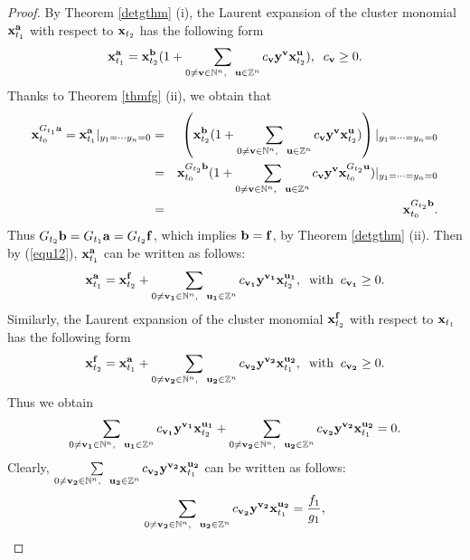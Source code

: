 \documentclass[14pt]{amsart}
\begin{document}
\begin{proof}
By Theorem \ref{detgthm} (i),  the Laurent expansion of the cluster monomial  ${\bf x}_{t_1}^{\bf a}$ with respect to ${\bf x}_{t_2}$  has the following form
\begin{equation}\label{equ12}
{\bf x}_{t_1}^{\bf a}={\bf x}_{t_2}^{{\bf b}}(1+\sum\limits_{0\neq {\bf v}\in\mathbb N^n,~~{\bf u}\in\mathbb Z^n}c_{\bf v}{\bf y}^{\bf v}{\bf x}_{t_2}^{\bf u}),\;\;c_{\bf v}\geq 0.
\end{equation}
Thanks to Theorem \ref{thmfg} (ii), we obtain that
\begin{eqnarray}
{\bf x}_{t_0}^{G_{t_1}{\bf a}}={\bf x}_{t_1}^{\bf a}|_{y_1=\cdots y_n=0}&=&\left({\bf x}_{t_2}^{{\bf b}}(1+\sum\limits_{0\neq {\bf v}\in\mathbb N^n,~~{\bf u}\in\mathbb Z^n}c_{\bf v}{\bf y}^{\bf v}{\bf x}_{t_2}^{\bf u})\right)|_{y_1=\cdots=y_n=0}\nonumber\\
&=&{\bf x}_{t_0}^{G_{t_2}{\bf b}}(1+\sum\limits_{0\neq {\bf v}\in\mathbb N^n,~~{\bf u}\in\mathbb Z^n}c_{\bf v}{\bf y}^{\bf v}{\bf x}_{t_0}^{G_{t_2}{\bf u}})|_{y_1=\cdots=y_n=0}\nonumber\\
&=&{\bf x}_{t_0}^{G_{t_2}{\bf b}}.\nonumber
\end{eqnarray}
Thus $G_{t_2}{\bf b}=G_{t_1}{\bf a}=G_{t_2}{\bf f}$, which implies ${\bf b}={\bf f}$, by Theorem \ref{detgthm} (ii).
 Then by (\ref{equ12}),  ${\bf x}_{t_1}^{\bf a}$ can be written as follows:
\begin{eqnarray}\label{adeqn}
{\bf x}_{t_1}^{\bf a}={\bf x}_{t_2}^{{\bf f}}+\sum\limits_{0\neq {\bf v_1}\in\mathbb N^n,~~{\bf u_1}\in\mathbb Z^n}c_{\bf v_1}{\bf y}^{\bf v_1}{\bf x}_{t_2}^{\bf u_1},\;\;\text{with}\;\; c_{\bf v_1}\geq 0.
\end{eqnarray}
Similarly, the Laurent expansion of the cluster monomial  ${\bf x}_{t_2}^{\bf f}$ with respect to ${\bf x}_{t_1}$  has the following form
$${\bf x}_{t_2}^{\bf f}={\bf x}_{t_1}^{{\bf a}}+\sum\limits_{0\neq {\bf v_2}\in\mathbb N^n,~~{\bf u_2}\in\mathbb Z^n}c_{\bf v_2}{\bf y}^{\bf v_2}{\bf x}_{t_1}^{\bf u_2},\;\;\text{with}\;\; c_{\bf v_2}\geq 0.$$
Thus we  obtain
$$\sum\limits_{0\neq {\bf v_1}\in\mathbb N^n,~~{\bf u_1}\in\mathbb Z^n}c_{\bf v_1}{\bf y}^{\bf v_1}{\bf x}_{t_2}^{\bf u_1}+\sum\limits_{0\neq {\bf v_2}\in\mathbb N^n,~~{\bf u_2}\in\mathbb Z^n}c_{\bf v_2}{\bf y}^{\bf v_2}{\bf x}_{t_1}^{\bf u_2}=0.$$
Clearly, $\sum\limits_{0\neq {\bf v_2}\in\mathbb N^n,~~{\bf u_2}\in\mathbb Z^n}c_{\bf v_2}{\bf y}^{\bf v_2}{\bf x}_{t_1}^{\bf u_2}$ can be written as follows:
$$\sum\limits_{0\neq {\bf v_2}\in\mathbb N^n,~~{\bf u_2}\in\mathbb Z^n}c_{\bf v_2}{\bf y}^{\bf v_2}{\bf x}_{t_1}^{\bf u_2}=\frac{f_1}{g_1},$$

\end{proof}
\end{document}
